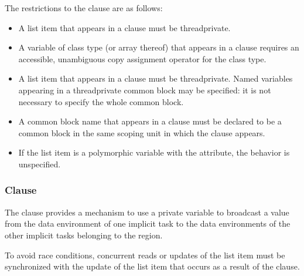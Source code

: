 \restrictions
The restrictions to the  clause are as follows:
\begin{ccppspecific}
\begin{itemize}
\item A list item that appears in a  clause must be threadprivate.

\item A variable of class type (or array thereof) that appears in a  clause requires
an accessible, unambiguous copy assignment operator for the class type.
\end{itemize}
\end{ccppspecific}

\begin{fortranspecific}
\begin{itemize}
\item A list item that appears in a  clause must be threadprivate. Named variables
appearing in a threadprivate common block may be specified: it is not necessary to
specify the whole common block.

\item A common block name that appears in a  clause must be declared to be a
common block in the same scoping unit in which the  clause appears.

\item If the list item is a polymorphic variable with the  attribute, the behavior is unspecified.
\end{itemize}
\end{fortranspecific}









\subsubsection{ Clause}
\label{subsubsec:copyprivate clause}
\summary
The  clause provides a mechanism to use a private variable to broadcast
a value from the data environment of one implicit task to the data environments of the
other implicit tasks belonging to the  region.

To avoid race conditions, concurrent reads or updates of the list item must be
synchronized with the update of the list item that occurs as a result of the
 clause.


